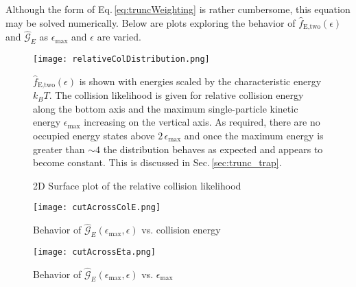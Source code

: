 Although the form of Eq.\,\ref{eq:truncWeighting} is rather cumbersome, this equation may be solved numerically.
Below are plots exploring the behavior of $\hat{f}_\text{E,two}(\epsilon)$ and $\hat{\mathcal{G}}_E$ as $\epsilon_\text{max}$ and $\epsilon$ are varied.
\begin{figure}
	\centerline{
	\texttt{[image: relativeColDistribution.png]}}
	\caption{2D Surface plot of the relative collision likelihood}{$\hat{f}_\text{E,two}(\epsilon)$ is shown with energies scaled by the characteristic energy $k_B T$. The collision likelihood is given for relative collision energy along the bottom axis and the maximum single-particle kinetic energy $\epsilon_\text{max}$ increasing on the vertical axis. As required, there are no occupied energy states above $2\,\epsilon_\text{max}$ and once the maximum energy is greater than $\sim\!4$ the distribution behaves as expected and appears to become constant. This is discussed in Sec.\,\ref{sec:trunc_trap}.}
	\label{fig:momSurfRelCol}
\end{figure} 

\begin{figure}
	\centerline{
	\texttt{[image: cutAcrossColE.png]}}
	\caption{Behavior of $\hat{\mathcal{G}}_E(\epsilon_\text{max}, \epsilon)$ vs. collision energy}
	\label{fig:relColvsColE}
\end{figure} 

\begin{figure}
	\centerline{
	\texttt{[image: cutAcrossEta.png]}}
	\caption{Behavior of $\hat{\mathcal{G}}_E(\epsilon_\text{max}, \epsilon)$ vs. $\epsilon_\text{max}$}
	\label{fig:relColvsEta}
\end{figure} 



%
%

